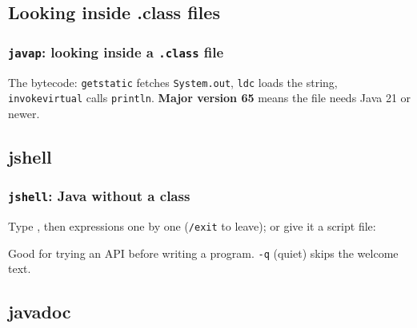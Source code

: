 \documentclass[aspectratio=169,10pt,compress]{beamer}
\begin{document}
\subsection[javap]{Looking inside .class files}




\begin{frame}[t,fragile] \frametitle{\texttt{javap}: looking inside a \texttt{.class} file}

  \vspace{0.1em}
  \small
  The bytecode: \texttt{getstatic} fetches \texttt{System.out}, \texttt{ldc} loads the string, \texttt{invokevirtual} calls \texttt{println}.
  \textbf{Major version 65} means the file needs Java 21 or newer.
\end{frame}

\subsection[jshell]{jshell}




\begin{frame}[t,fragile] \frametitle{\texttt{jshell}: Java without a class}
  \small Type , then expressions one by one (\texttt{/exit} to leave); or give it a script file:


  \vspace{0.1em}
  \small Good for trying an API before writing a program. \texttt{-q} (quiet) skips the welcome text.
\end{frame}

\subsection[javadoc]{javadoc}
\end{document}
